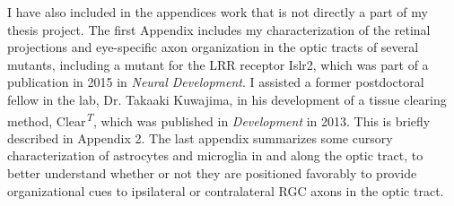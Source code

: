 I have also included in the appendices work that is not directly a part of my thesis project.
The first Appendix includes my characterization of the retinal projections and eye-specific axon organization in the optic tracts of several mutants, including a mutant for the LRR receptor Islr2, which was part of a publication in 2015 in \emph{Neural Development}.
I assisted a former postdoctoral fellow in the lab, Dr. Takaaki Kuwajima, in his development of a tissue clearing method, Clear\textsuperscript{\emph{T}}, which was published in \emph{Development} in 2013.
This is briefly described in Appendix 2.
The last appendix summarizes some cursory characterization of astrocytes and microglia in and along the optic tract, to better understand whether or not they are positioned favorably to provide organizational cues to ipsilateral or contralateral RGC axons in the optic tract.
